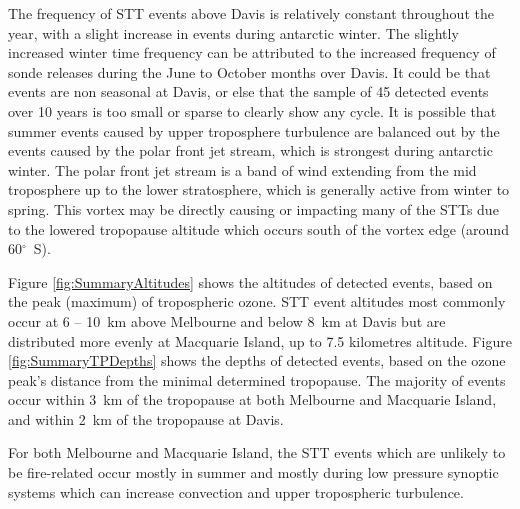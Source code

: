 \documentclass{article}
\begin{document}
  The frequency of STT events above Davis is relatively constant throughout the year, with a slight increase in events during antarctic winter.
  The slightly increased winter time frequency can be attributed to the increased frequency of sonde releases during the June to October months over Davis.
  It could be that events are non seasonal at Davis, or else that the sample of 45 detected events over 10 years is too small or sparse to clearly show any cycle.
  It is possible that summer events caused by upper troposphere turbulence are balanced out by the events caused by the polar front jet stream, which is strongest during antarctic winter.
  The polar front jet stream is a band of wind extending from the mid troposphere up to the lower stratosphere, which is generally active from winter to spring. 
  This vortex may be directly causing or impacting many of the STTs due to the lowered tropopause altitude which occurs south of the vortex edge (around 60$^\circ$~S).

  Figure \ref{fig:SummaryAltitudes} shows the altitudes of detected events, based on the peak (maximum) of tropospheric ozone.
  STT event altitudes most commonly occur at 6 -- 10~km above Melbourne and below 8~km at Davis but are distributed more evenly at Macquarie Island, up to 7.5 kilometres altitude.
  Figure \ref{fig:SummaryTPDepths} shows the depths of detected events, based on the ozone peak's distance from the minimal determined tropopause.
  The majority of events occur within 3~km of the tropopause at both Melbourne and Macquarie Island, and within 2~km of the tropopause at Davis.
  
  For both Melbourne and Macquarie Island, the STT events which are unlikely to be fire-related occur mostly in summer and mostly during low pressure synoptic systems which can increase convection and upper tropospheric turbulence.
\end{document}
